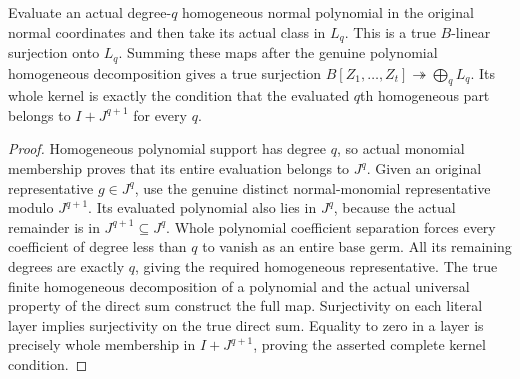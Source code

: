\begin{theorem}
\label{hir:relative-normal-graded-homogeneous-surjection}
\leanok
{}
Evaluate an actual degree-$q$ homogeneous normal polynomial in the
original normal coordinates and then take its actual class in $L_q$.
This is a true $B$-linear surjection onto $L_q$. Summing these maps after
the genuine polynomial homogeneous decomposition gives a true surjection
$B[Z_1,\ldots,Z_t]\twoheadrightarrow\bigoplus_qL_q$.
Its whole kernel is exactly the condition that the evaluated $q$th
homogeneous part belongs to $I+J^{q+1}$ for every $q$.
\end{theorem}
\begin{proof}
Homogeneous polynomial support has degree $q$, so actual monomial
membership proves that its entire evaluation belongs to $J^q$.
Given an original representative $g\in J^q$, use the genuine distinct
normal-monomial representative modulo $J^{q+1}$. Its evaluated polynomial
also lies in $J^q$, because the actual remainder is in $J^{q+1}\subseteq
J^q$. Whole polynomial coefficient separation forces every coefficient
of degree less than $q$ to vanish as an entire base germ. All its
remaining degrees are exactly $q$, giving the required homogeneous
representative. The true finite homogeneous decomposition of a polynomial
and the actual universal property of the direct sum construct the full
map. Surjectivity on each literal layer implies surjectivity on the true
direct sum. Equality to zero in a layer is precisely whole membership in
$I+J^{q+1}$, proving the asserted complete kernel condition.
\end{proof}

